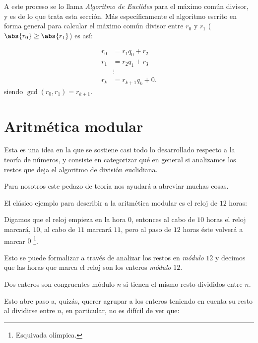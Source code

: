 A este proceso se lo llama \textit{Algoritmo de Euclides}
para el máximo común divisor, y es de lo que trata
esta sección. Más específicamente el algoritmo escrito
en forma general para calcular el máximo
común divisor entre $r_0$ y $r_1$ ($\abs{r_0} \geq \abs{r_1}$) es así:

\begin{minipage}{\textwidth}
	\begin{align*}
		r_0 & =      r_1q_0 + r_2      \\
		r_1 & =      r_2q_1 + r_3      \\
		    & \vdots                   \\
		r_k & =      r_{k + 1}q_k + 0.
	\end{align*}
	siendo $\gcd(r_0, r_1) = r_{k + 1}$.
\end{minipage}

\section{Aritmética modular}
Esta es una idea en la que se sostiene
casi todo lo desarrollado respecto
a la teoría de números, y consiste en
categorizar qué en general
si analizamos los restos que deja
el algoritmo de división euclidiana.

Para nosotros este pedazo de teoría
nos ayudará a abreviar muchas cosas.

El clásico ejemplo para describir a la
aritmética modular es el reloj de $12$ horas:


Digamos que el reloj empieza en la hora $0$,
entonces al cabo de $10$ horas el reloj
marcará, $10$, al cabo de $11$ marcará $11$,
pero al paso de $12$ horas éste volverá a marcar $0$
\footnote{Esquivada olímpica.}. %

Esto se puede formalizar a través de
analizar los restos en \textit{módulo} $12$
y decimos que las horas que marca el reloj
son los enteros \textit{módulo} $12$.

\begin{definition}
	Dos enteros son congruentes módulo $n$
	si tienen el mismo resto divididos entre $n$.
\end{definition}

Esto abre paso a, quizás, querer agrupar
a los enteros teniendo en cuenta
su resto al dividirse entre $n$,
en particular, no es difícil de ver que:

